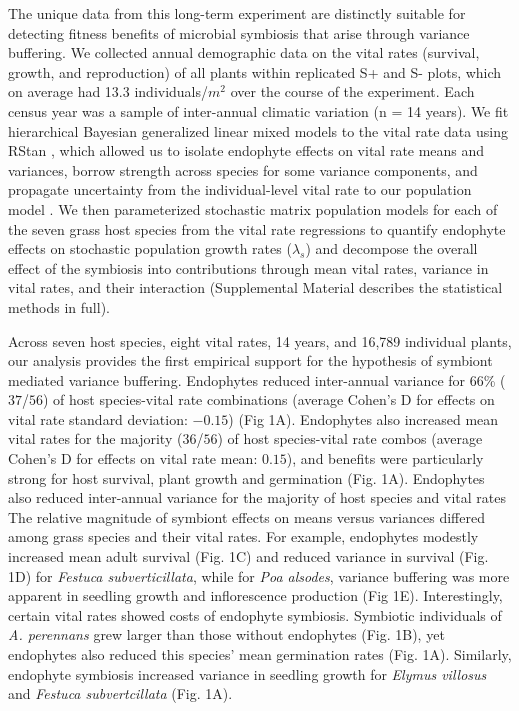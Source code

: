 \documentclass[12pt]{article}
\begin{document}
The unique data from this long-term experiment are distinctly suitable for detecting fitness benefits of microbial symbiosis that arise through variance buffering. 
We collected annual demographic data on the vital rates (survival, growth, and reproduction) of all plants within replicated S+ and S- plots, which on average had 13.3 individuals/$m^2$ over the course of the experiment. 
Each census year was a sample of inter-annual climatic variation (n = 14 years).
We fit hierarchical Bayesian generalized linear mixed models to the vital rate data using RStan \cite{rstan2022}, which allowed us to isolate endophyte effects on vital rate means and variances, borrow strength across species for some variance components, and propagate uncertainty from the individual-level vital rate to our population model \cite{elderd2016quantifying}. 
We then parameterized stochastic matrix population models for each of the seven grass host species from the vital rate regressions to quantify endophyte effects on stochastic population growth rates ($\lambda_s$) and decompose the overall effect of the symbiosis into contributions through mean vital rates, variance in vital rates, and their interaction (Supplemental Material describes the statistical methods in full).

Across seven host species, eight vital rates, 14 years, and 16,789 individual plants, our analysis provides the first empirical support for the hypothesis of symbiont mediated variance buffering. Endophytes reduced inter-annual variance for 66\% ($37$/$56$) of host species-vital rate combinations (average Cohen's D for effects on vital rate standard deviation: $-0.15$) (Fig 1A). 
Endophytes also increased mean vital rates for the majority ($36$/$56$) of host species-vital rate combos (average Cohen's D for effects on vital rate mean: $0.15$), and benefits were particularly strong for host survival, plant growth and germination (Fig. 1A).
Endophytes also reduced inter-annual variance for the majority of host species and vital rates 
The relative magnitude of symbiont effects on means versus variances differed among grass species and their vital rates.
For example, endophytes modestly increased mean adult survival (Fig. 1C) and reduced variance in survival (Fig. 1D) for \emph{Festuca subverticillata}, while for \emph{Poa alsodes}, variance buffering was more apparent in seedling growth and inflorescence production (Fig 1E). 
Interestingly, certain vital rates showed costs of endophyte symbiosis. 
Symbiotic individuals of \emph{A. perennans} grew larger than those without endophytes (Fig. 1B), yet endophytes also reduced this species' mean germination rates (Fig. 1A). 
Similarly, endophyte symbiosis increased variance in seedling growth for \emph{Elymus villosus} and \emph{Festuca subvertcillata} (Fig. 1A).
 
\end{document}
